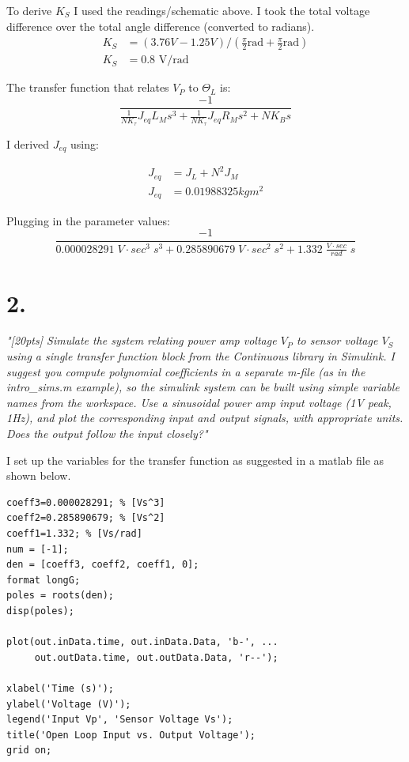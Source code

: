 \documentclass{article}
\begin{document}
To derive $K_S$ I used the readings/schematic above.
I took the total voltage difference over the total angle difference (converted to radians).
\begin{align}
    K_S&=(3.76V-1.25V)/(\frac{\pi}{2}\text{rad}+\frac{\pi}{2}\text{rad}) \\
    K_S&=0.8\text{ V/rad}
\end{align}

The transfer function that relates $V_P$ to $\Theta_L$ is:
\begin{equation}
    \frac{-1}{\frac{1}{NK_{\tau}}J_{eq}L_Ms^3 + \frac{1}{NK_{\tau}}J_{eq}R_Ms^2+NK_Bs}
\end{equation} 

I derived $J_{eq}$ using:

\begin{align*}
    J_{eq} &= J_L + N^2J_M \\
    J_{eq} &= 0.01988325kgm^2
\end{align*}

Plugging in the parameter values:
\begin{equation}
    \frac{-1}{0.000028291\;V\cdot sec^3 \;s^3 + 0.285890679\;V\cdot sec^2\;s^2+1.332\;\frac{V\cdot sec}{rad}\;s}
\end{equation} 

\section*{2.}

\textit{
    "[20pts] Simulate the system relating power amp voltage $V_P$ to sensor voltage $V_S$ using a single
    transfer function block from the Continuous library in Simulink. I suggest you compute
    polynomial coefficients in a separate m-file (as in the intro\_sims.m example), so the simulink
    system can be built using simple variable names from the workspace. Use a sinusoidal power
    amp input voltage (1V peak, 1Hz), and plot the corresponding input and output signals, with
    appropriate units. Does the output follow the input closely?"
}

I set up the variables for the transfer function as suggested in a matlab file as shown below.

\begin{lstlisting}[style=matlabstyle]
coeff3=0.000028291; % [Vs^3]
coeff2=0.285890679; % [Vs^2]
coeff1=1.332; % [Vs/rad]
num = [-1];
den = [coeff3, coeff2, coeff1, 0];
format longG;
poles = roots(den);
disp(poles);

plot(out.inData.time, out.inData.Data, 'b-', ...
     out.outData.time, out.outData.Data, 'r--');

xlabel('Time (s)');
ylabel('Voltage (V)');
legend('Input Vp', 'Sensor Voltage Vs');
title('Open Loop Input vs. Output Voltage');
grid on;
\end{lstlisting}
\end{document}
